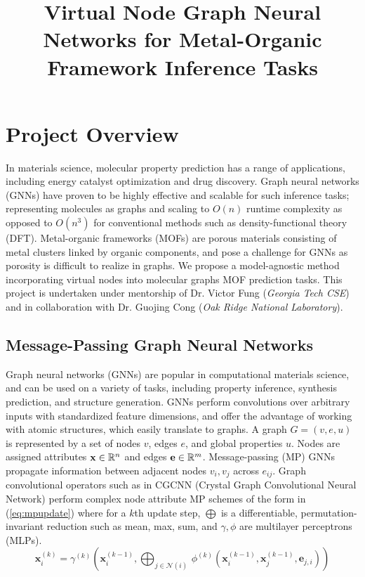 \documentclass{lxaiproposal}
\title{Virtual Node Graph Neural Networks for Metal-Organic Framework Inference Tasks\\}
\author{\coord{Sidharth Baskaran}{}{1}}
\begin{document}
\noindent
\maketitle

\section*{Project Overview}

In materials science, molecular property prediction has a range of applications, including
energy catalyst optimization and drug discovery. Graph neural networks (GNNs) have proven to be highly effective and scalable for such inference tasks; representing molecules as graphs and scaling to $O(n)$ runtime complexity as opposed to $O(n^3)$ for conventional methods such as density-functional theory (DFT). Metal-organic frameworks (MOFs) are porous materials consisting of metal clusters linked by organic components, and pose a challenge for GNNs as porosity is difficult to realize in graphs. We propose a model-agnostic method incorporating virtual nodes into molecular graphs MOF prediction tasks. This project is undertaken under mentorship of Dr. Victor Fung (\textit{Georgia Tech CSE}) and in collaboration with Dr. Guojing Cong (\textit{Oak Ridge National Laboratory}).

\subsection*{Message-Passing Graph Neural Networks}

Graph neural networks (GNNs) are popular in computational materials science, and can be used on a variety of tasks, including property inference, synthesis prediction, and structure generation\cite{Reiser2022}. GNNs perform convolutions over arbitrary inputs with standardized feature dimensions, and offer the advantage of working with atomic structures, which easily translate to graphs. A graph $G=(v,e,u)$ is represented by a set of nodes $v$, edges $e$, and global properties $u$. Nodes are assigned attributes ${\bf x}\in \mathbb{R}^{n}$ and edges ${\bf e}\in \mathbb{R}^m$. Message-passing (MP) GNNs propagate information between adjacent nodes $v_i,v_j$ across $e_{ij}$. Graph convolutional operators such as in CGCNN (Crystal Graph Convolutional Neural Network)\cite{Xie_2018} perform complex node attribute MP schemes of the form in (\ref{eq:mpupdate}) where for a $k$th update step, $\bigoplus$ is a differentiable, permutation-invariant reduction such as mean, max, sum, and $\gamma,\phi$ are multilayer perceptrons (MLPs)\cite{sanchez-lengeling2021a}.
\begin{equation}
    \textstyle
    \mathbf{x}_i^{(k)} = \gamma^{(k)} \left( \mathbf{x}_i^{(k-1)}, \bigoplus_{j \in \mathcal{N}(i)} \, \phi^{(k)}\left(\mathbf{x}_i^{(k-1)}, \mathbf{x}_j^{(k-1)},\mathbf{e}_{j,i}\right) \right)
    \label{eq:mpupdate}
\end{equation}
\end{document}
